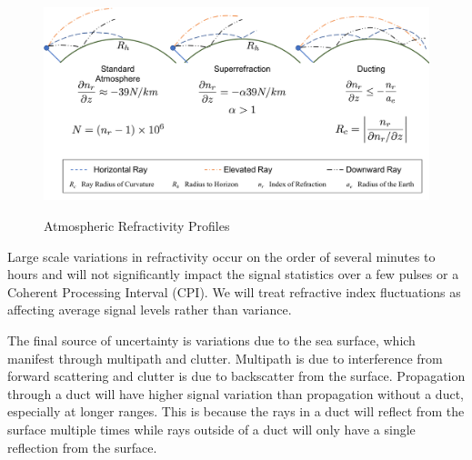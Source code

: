 \begin{figure}[H]
  \begin{center}
\includegraphics[width=6in]{../media/multistatic/earth_refractivity.png}
  \end{center}
  \renewcommand{\baselinestretch}{1} \small\normalsize
  \begin{quote}
    \caption[Atmospheric Refractivity Profiles]{Atmospheric Refractivity Profiles\label{rmt_fig:2}}
  \end{quote}
\end{figure}
\renewcommand{\baselinestretch}{2} \small\normalsize

Large scale variations in refractivity occur on the order of several minutes to hours and will not significantly impact the signal statistics over a few pulses or a Coherent Processing Interval (CPI). We will treat refractive index fluctuations as affecting average signal levels rather than variance.

The final source of uncertainty is variations due to the sea surface, which manifest through multipath and clutter. Multipath is due to interference from forward scattering and clutter is due to backscatter from the surface. Propagation through a duct will have higher signal variation than propagation without a duct, especially at longer ranges. This is because the rays in a duct will reflect from the surface multiple times while rays outside of a duct will only have a single reflection from the surface.
